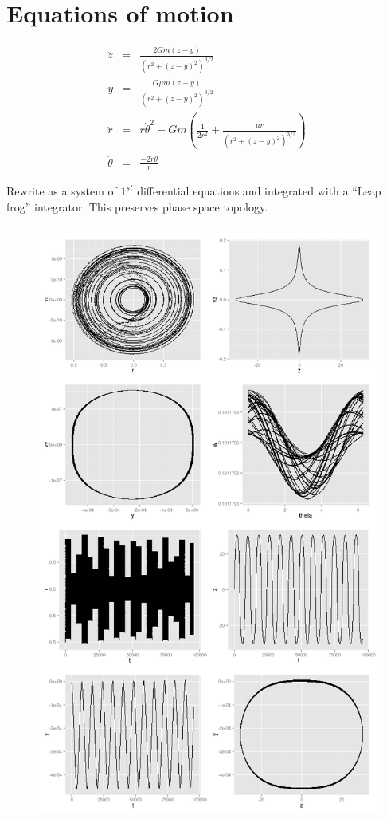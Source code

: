 \documentclass{article}
\begin{document}
\section{Equations of motion}

\begin{eqnarray}
\ddot{z} & = & \frac{2G m (z-y)}{(r^2 + (z-y)^2)^{3/2}} \\
\ddot{y} & = & \frac{G \mu m (z-y)}{(r^2 + (z-y)^2)^{3/2}} \\
\ddot{r} & = & r\dot{\theta}^2 - Gm (\frac{1}{2r^2} + \frac{\mu r}{(r^2 + (z-y)^2)^{3/2}}) \\
\ddot{\theta} & = & \frac{-2 \dot{r} \dot{\theta}}{r} 
\label{eq:mot}
\end{eqnarray}

Rewrite as a system of $1^{st}$ differential equations and integrated with a ``Leap frog'' integrator. This
preserves phase space topology.

\begin{figure}[h]
    \begin{center}
        \includegraphics[height=7.75in]{./img/example.png}
    \end{center}
\label{fig:example}
\end{figure}
\end{document}
